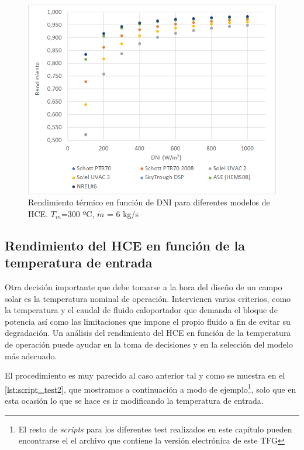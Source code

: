 \begin{figure}[H]
\includegraphics[width=0.8\linewidth, height=0.55\linewidth]{images/rendimiento_dni.png}
\caption[Rendimiento térmico en función de DNI para diferentes modelos de HCE]{Rendimiento térmico en función de DNI para diferentes modelos de HCE. $T_{in}$=300 ºC, $\dot m$ = 6 kg/s} 
\label{fig:test1a}
\end{figure}


\subsection{Rendimiento del HCE en función de la temperatura de entrada}

Otra decisión importante que debe tomarse a la hora del diseño de  un campo solar es la temperatura nominal de operación. Intervienen varios criterios, como la temperatura y el caudal de fluido caloportador que demanda el bloque de potencia así como las limitaciones que impone el propio fluido a fin de evitar su degradación.  Un análisis del rendimiento del HCE en función de la temperatura de operación puede ayudar en la toma de decisiones y  en la selección del modelo más adecuado.

El procedimiento es muy parecido al caso anterior tal y como se muestra en el \ref{lst:script_test2}, que mostramos a continuación a modo de ejemplo\footnote{El resto de \emph{scripts} para los diferentes test realizados en este capítulo pueden encontrarse el el archivo que contiene la versión electrónica de este TFG}, solo que en esta ocasión lo que se hace es ir modificando la temperatura de entrada. 

